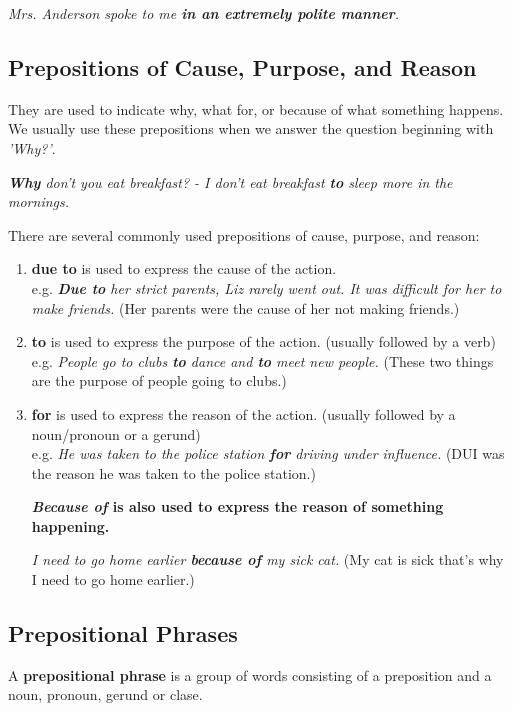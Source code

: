 \documentclass[hidelinks,10pt,a4paper]{article}
\begin{document}
\begin{center}
	\textit{Mrs. Anderson spoke to me \textbf{in an extremely polite manner}.}
\end{center}

\subsection{Prepositions of Cause, Purpose, and Reason}
They are used to indicate why, what for, or because of what something happens. We usually use these prepositions when we answer the question beginning with \textit{'Why?'}.

\begin{center}
	\textit{\textbf{Why} don't you eat breakfast? - I don't eat breakfast \textbf{to} sleep more in the mornings.}
\end{center}

There are several commonly used prepositions of cause, purpose, and reason:
\begin{enumerate}[label=(\alph*)]
	\item \textbf{due to} is used to express the cause of the action.\\
		e.g. \textit{\textbf{Due to} her strict parents, Liz rarely went out. It was difficult for her to make friends.} (Her parents were the cause of her not making friends.)
	\item \textbf{to}  is used to express the purpose of the action. (usually followed by a verb) \\
		e.g. \textit{People go to clubs \textbf{to} dance and \textbf{to} meet new people.} (These two things are the purpose of people going to clubs.)
	\item \textbf{for} is used to express the reason of the action. (usually followed by a noun/pronoun or a gerund)\\
		e.g. \textit{He was taken to the police station \textbf{for} driving under influence.} (DUI was the reason he was taken to the police station.)
		\begin{center}
			\textbf{\textit{Because of} is also used to express the reason of something happening. }
		\end{center}
		\textit{I need to go home earlier \textbf{because of} my sick cat.} (My cat is sick that's why I need to go home earlier.)
\end{enumerate}

\subsection{Prepositional Phrases}
A \textbf{prepositional phrase} is a group of words consisting of a preposition and a noun, pronoun, gerund or clase.
\end{document}
